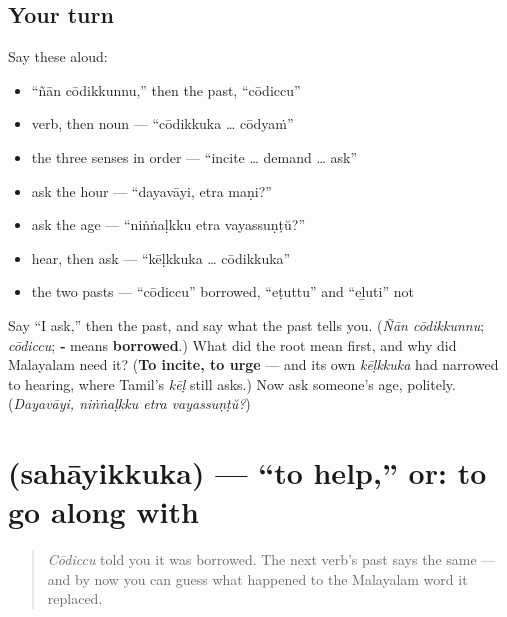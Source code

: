 \subsection*{Your turn}
Say these aloud:

\begin{itemize}
\raggedright
  \item \textquotedblleft{}ñān cōdikkunnu,\textquotedblright{} then the past, \textquotedblleft{}cōdiccu\textquotedblright{}
  \item verb, then noun — \textquotedblleft{}cōdikkuka … cōdyaṁ\textquotedblright{}
  \item the three senses in order — \textquotedblleft{}incite … demand … ask\textquotedblright{}
  \item ask the hour — \textquotedblleft{}dayavāyi, etra maṇi?\textquotedblright{}
  \item ask the age — \textquotedblleft{}niṅṅaḷkku etra vayassuṇṭŭ?\textquotedblright{}
  \item hear, then ask — \textquotedblleft{}kēḷkkuka … cōdikkuka\textquotedblright{}
  \item the two pasts — \textquotedblleft{}cōdiccu\textquotedblright{} borrowed, \textquotedblleft{}eṭuttu\textquotedblright{} and \textquotedblleft{}eḻuti\textquotedblright{} not
\end{itemize}

\begin{tcolorbox}[breakable,colback=teal!4,colframe=teal!35!black,title={Before you move on}]
Say \textquotedblleft{}I ask,\textquotedblright{} then the past, and say what the past tells you. (\emph{Ñān cōdikkunnu}; \emph{cōdiccu}; \textbf{‑} means \textbf{borrowed}.) What did the root mean first, and why did Malayalam need it? (\textbf{To incite, to urge} — and its own \emph{kēḷkkuka} had narrowed to hearing, where Tamil's \emph{kēḷ} still asks.) Now ask someone's age, politely. (\emph{Dayavāyi, niṅṅaḷkku etra vayassuṇṭŭ?})
\end{tcolorbox}
\section[\texorpdfstring{\ml{സഹായിക്കുക} (sahāyikkuka)}{സഹായിക്കുക (sahāyikkuka)}]{ (sahāyikkuka) — \textquotedblleft{}to help,\textquotedblright{} or: to go along with}

\label{lesson:ML-C34-sahaayikkuka}



\begin{quote}
\emph{Cōdiccu} told you it was borrowed. The next verb's past says the same — and by now you can guess what happened to the Malayalam word it replaced.
\end{quote}

